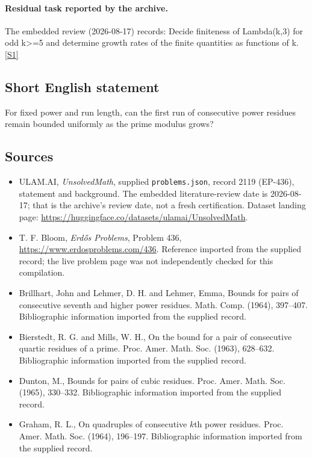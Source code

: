\documentclass[11pt,a4paper]{article}
\newcommand{\sref}[2]{\hyperlink{source:#1:#2}{[S#2]}}
\begin{document}
\paragraph{Residual task reported by the archive.}

The embedded review (2026-08-17) records: Decide finiteness of Lambda(k,3) for odd k>=5 and determine growth rates of the finite quantities as functions of k. \sref{2119}{1}

\subsection{Short English statement}

For fixed power and run length, can the first run of consecutive power residues remain bounded uniformly as the prime modulus grows?

\subsection{Sources}

{\small

\begin{itemize}

\item[\hypertarget{source:2119:1}{S1}] ULAM.AI, \emph{UnsolvedMath}, supplied \texttt{problems.json}, record 2119 (EP-436), statement and background. The embedded literature-review date is 2026-08-17; that is the archive’s review date, not a fresh certification. Dataset landing page: \url{https://huggingface.co/datasets/ulamai/UnsolvedMath}.

\item[\hypertarget{source:2119:2}{S2}] T. F. Bloom, \emph{Erdős Problems}, Problem 436, \url{https://www.erdosproblems.com/436}. Reference imported from the supplied record; the live problem page was not independently checked for this compilation.

\item[\hypertarget{source:2119:3}{S3}] Brillhart, John and Lehmer, D. H. and Lehmer, Emma, Bounds for pairs of consecutive seventh and higher power residues. Math. Comp. (1964), 397--407. Bibliographic information imported from the supplied record.

\item[\hypertarget{source:2119:4}{S4}] Bierstedt, R. G. and Mills, W. H., On the bound for a pair of consecutive quartic residues of a prime. Proc. Amer. Math. Soc. (1963), 628--632. Bibliographic information imported from the supplied record.

\item[\hypertarget{source:2119:5}{S5}] Dunton, M., Bounds for pairs of cubic residues. Proc. Amer. Math. Soc. (1965), 330--332. Bibliographic information imported from the supplied record.

\item[\hypertarget{source:2119:6}{S6}] Graham, R. L., On quadruples of consecutive {$k$}th power residues. Proc. Amer. Math. Soc. (1964), 196--197. Bibliographic information imported from the supplied record.

\end{itemize}

}

\label{end:2119}
\end{document}
